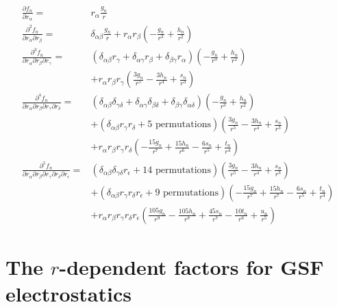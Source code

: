 \begin{align}
\frac{\partial f_n}{\partial r_\alpha} =&r_\alpha \frac {g_n}{r} \label{eq:b9}\\
\frac{\partial^2 f_n}{\partial r_\alpha \partial r_\beta} =&\delta_{\alpha \beta}\frac {g_n}{r} 
+r_\alpha r_\beta \left( -\frac{g_n}{r^3} +\frac{h_n}{r^2}\right) \\
\frac{\partial^3 f_n}{\partial r_\alpha \partial r_\beta \partial r_\gamma} =&
\left( \delta_{\alpha \beta} r_\gamma + \delta_{\alpha \gamma} r_\beta + 
\delta_{ \beta \gamma} r_\alpha \right)  
\left(  -\frac{g_n}{r^3} +\frac{h_n}{r^2} \right) \nonumber \\
& + r_\alpha r_\beta r_\gamma 
\left(  \frac{3g_n}{r^5}-\frac{3h_n}{r^4} +\frac{s_n}{r^3} \right) \\
\frac{\partial^4 f_n}{\partial r_\alpha \partial r_\beta \partial
  r_\gamma \partial r_\delta} =& 
\left( \delta_{\alpha \beta} \delta_{\gamma \delta} 
+ \delta_{\alpha \gamma} \delta_{\beta \delta}
 +\delta_{ \beta \gamma} \delta_{\alpha \delta} \right)
\left( - \frac{g_n}{r^3} + \frac{h_n}{r^2} \right)  \nonumber \\ 
&+ \left( \delta_{\alpha \beta} r_\gamma r_\delta
+ \text{5 permutations}
\right) \left( \frac{3 g_n}{r^5} - \frac{3h_n}{r^4} + \frac{s_n}{r^3} 
\right) \nonumber \\
&+ r_\alpha r_\beta r_\gamma r_\delta
\left(  -\frac{15g_n}{r^7} + \frac{15h_n}{r^6} - \frac{6s_n}{r^5}
+ \frac{t_n}{r^4} \right)\\
\frac{\partial^5 f_n}
{\partial r_\alpha \partial r_\beta \partial r_\gamma \partial
  r_\delta \partial r_\epsilon} =& 
\left( \delta_{\alpha \beta} \delta_{\gamma \delta} r_\epsilon
+ \text{14 permutations} \right) 
\left(  \frac{3g_n}{r^5}-\frac{3h_n}{r^4} +\frac{s_n}{r^3} \right) \nonumber \\
&+ \left( \delta_{\alpha \beta} r_\gamma r_\delta r_\epsilon
+ \text{9 permutations}
\right) \left(- \frac{15g_n}{r^7}+\frac{15h_n}{r^7} -\frac{6s_n}{r^5} +\frac{t_n}{r^4} 
\right) \nonumber \\
&+ r_\alpha r_\beta r_\gamma r_\delta r_\epsilon
\left(  \frac{105g_n}{r^9} - \frac{105h_n}{r^8} + \frac{45s_n}{r^7}
- \frac{10t_n}{r^6} +\frac{u_n}{r^5} \right) \label{eq:b13}
\end{align}


\section{The $r$-dependent factors for GSF electrostatics}
\label{radialGSF}

